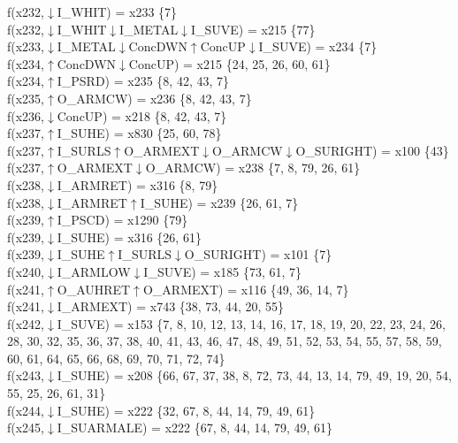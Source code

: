 f(x232,$\downarrow$I\_WHIT) = x233 \{7\} \\  
f(x232,$\downarrow$I\_WHIT$\downarrow$I\_METAL$\downarrow$I\_SUVE) = x215 \{77\} \\  
f(x233,$\downarrow$I\_METAL$\downarrow$ConcDWN$\uparrow$ConcUP$\downarrow$I\_SUVE) = x234 \{7\} \\  
f(x234,$\uparrow$ConcDWN$\downarrow$ConcUP) = x215 \{24, 25, 26, 60, 61\} \\  
f(x234,$\uparrow$I\_PSRD) = x235 \{8, 42, 43, 7\} \\  
f(x235,$\uparrow$O\_ARMCW) = x236 \{8, 42, 43, 7\} \\  
f(x236,$\downarrow$ConcUP) = x218 \{8, 42, 43, 7\} \\  
f(x237,$\uparrow$I\_SUHE) = x830 \{25, 60, 78\} \\  
f(x237,$\uparrow$I\_SURLS$\uparrow$O\_ARMEXT$\downarrow$O\_ARMCW$\downarrow$O\_SURIGHT) = x100 \{43\} \\  
f(x237,$\uparrow$O\_ARMEXT$\downarrow$O\_ARMCW) = x238 \{7, 8, 79, 26, 61\} \\  
f(x238,$\downarrow$I\_ARMRET) = x316 \{8, 79\} \\  
f(x238,$\downarrow$I\_ARMRET$\uparrow$I\_SUHE) = x239 \{26, 61, 7\} \\  
f(x239,$\uparrow$I\_PSCD) = x1290 \{79\} \\  
f(x239,$\downarrow$I\_SUHE) = x316 \{26, 61\} \\  
f(x239,$\downarrow$I\_SUHE$\uparrow$I\_SURLS$\downarrow$O\_SURIGHT) = x101 \{7\} \\  
f(x240,$\downarrow$I\_ARMLOW$\downarrow$I\_SUVE) = x185 \{73, 61, 7\} \\  
f(x241,$\uparrow$O\_AUHRET$\uparrow$O\_ARMEXT) = x116 \{49, 36, 14, 7\} \\  
f(x241,$\downarrow$I\_ARMEXT) = x743 \{38, 73, 44, 20, 55\} \\  
f(x242,$\downarrow$I\_SUVE) = x153 \{7, 8, 10, 12, 13, 14, 16, 17, 18, 19, 20, 22, 23, 24, 26, 28, 30, 32, 35, 36, 37, 38, 40, 41, 43, 46, 47, 48, 49, 51, 52, 53, 54, 55, 57, 58, 59, 60, 61, 64, 65, 66, 68, 69, 70, 71, 72, 74\} \\  
f(x243,$\downarrow$I\_SUHE) = x208 \{66, 67, 37, 38, 8, 72, 73, 44, 13, 14, 79, 49, 19, 20, 54, 55, 25, 26, 61, 31\} \\  
f(x244,$\downarrow$I\_SUHE) = x222 \{32, 67, 8, 44, 14, 79, 49, 61\} \\  
f(x245,$\downarrow$I\_SUARMALE) = x222 \{67, 8, 44, 14, 79, 49, 61\} \\  
